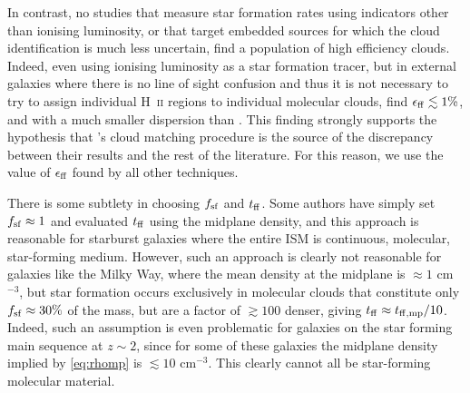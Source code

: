\documentclass[useAMS,usenatbib]{mn2e}
\begin{document}
In contrast, no studies that measure star formation rates using indicators other than ionising luminosity, or that target embedded sources for which the cloud identification is much less uncertain, find a population of high efficiency clouds. Indeed, even using ionising luminosity as a star formation tracer, but in external galaxies where there is no line of sight confusion and thus it is not necessary to try to assign individual H~\textsc{ii} regions to individual molecular clouds, \citet{leroy17a} find $\epsilon_{\rm ff} \lesssim 1\%$, and with a much smaller dispersion than \citet{lee16a}. This finding strongly supports the hypothesis that \citeauthor{lee16a}'s cloud matching procedure is the source of the discrepancy between their results and the rest of the literature. For this reason, we use the value of $\epsilon_{\rm ff}$ found by all other techniques.

There is some subtlety in choosing $f_{\rm sf}$ and $t_{\rm ff}$. Some authors have simply set $f_{\rm sf} \approx 1$ and evaluated $t_{\rm ff}$ using the midplane density, and this approach is reasonable for starburst galaxies where the entire ISM is continuous, molecular, star-forming medium. However, such an approach is clearly not reasonable for galaxies like the Milky Way, where the mean density at the midplane is $\approx 1$ cm$^{-3}$, but star formation occurs exclusively in molecular clouds that constitute only $f_{\rm sf}\approx 30\%$ of the mass, but are a factor of $\gtrsim 100$ denser, giving $t_{\rm ff} \approx t_{\rm ff,mp}/10$. Indeed, such an assumption is even problematic for galaxies on the star forming main sequence at $z\sim 2$, since for some of these galaxies the midplane density implied by \autoref{eq:rhomp} is $\lesssim 10$ cm$^{-3}$. This clearly cannot all be star-forming molecular material.
\end{document}
